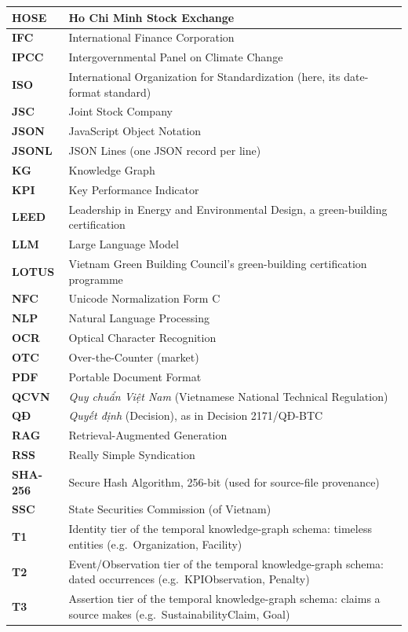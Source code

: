 \documentclass[fontsize=12pt,oneside,headings=small]{scrreprt}
\begin{document}
\begin{center}
\begin{longtable}{|>{\bfseries}p{2.6cm}|p{12.4cm}|}
HOSE & Ho Chi Minh Stock Exchange \\ \hline
IFC & International Finance Corporation \\ \hline
IPCC & Intergovernmental Panel on Climate Change \\ \hline
ISO & International Organization for Standardization (here, its date-format standard) \\ \hline
JSC & Joint Stock Company \\ \hline
JSON & JavaScript Object Notation \\ \hline
JSONL & JSON Lines (one JSON record per line) \\ \hline
KG & Knowledge Graph \\ \hline
KPI & Key Performance Indicator \\ \hline
LEED & Leadership in Energy and Environmental Design, a green-building certification \\ \hline
LLM & Large Language Model \\ \hline
LOTUS & Vietnam Green Building Council's green-building certification programme \\ \hline
NFC & Unicode Normalization Form C \\ \hline
NLP & Natural Language Processing \\ \hline
OCR & Optical Character Recognition \\ \hline
OTC & Over-the-Counter (market) \\ \hline
PDF & Portable Document Format \\ \hline
QCVN & \textit{Quy chuẩn Việt Nam} (Vietnamese National Technical Regulation) \\ \hline
QĐ & \textit{Quyết định} (Decision), as in Decision 2171/QĐ-BTC \\ \hline
RAG & Retrieval-Augmented Generation \\ \hline
RSS & Really Simple Syndication \\ \hline
SHA-256 & Secure Hash Algorithm, 256-bit (used for source-file provenance) \\ \hline
SSC & State Securities Commission (of Vietnam) \\ \hline
T1 & Identity tier of the temporal knowledge-graph schema: timeless entities (e.g.\ Organization, Facility) \\ \hline
T2 & Event/Observation tier of the temporal knowledge-graph schema: dated occurrences (e.g.\ KPIObservation, Penalty) \\ \hline
T3 & Assertion tier of the temporal knowledge-graph schema: claims a source makes (e.g.\ SustainabilityClaim, Goal) \\ \hline

\end{longtable}
\end{center}
\end{document}
